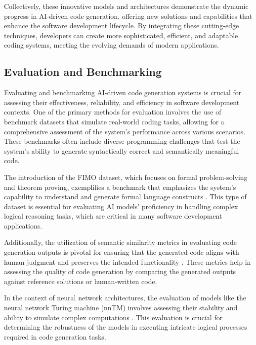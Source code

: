 Collectively, these innovative models and architectures demonstrate the dynamic progress in AI-driven code generation, offering new solutions and capabilities that enhance the software development lifecycle. By integrating these cutting-edge techniques, developers can create more sophisticated, efficient, and adaptable coding systems, meeting the evolving demands of modern applications.



\subsection{Evaluation and Benchmarking} \label{subsec:Evaluation and Benchmarking}

Evaluating and benchmarking AI-driven code generation systems is crucial for assessing their effectiveness, reliability, and efficiency in software development contexts. One of the primary methods for evaluation involves the use of benchmark datasets that simulate real-world coding tasks, allowing for a comprehensive assessment of the system's performance across various scenarios. These benchmarks often include diverse programming challenges that test the system's ability to generate syntactically correct and semantically meaningful code.



The introduction of the FIMO dataset, which focuses on formal problem-solving and theorem proving, exemplifies a benchmark that emphasizes the system's capability to understand and generate formal language constructs \cite{liu2023fimochallengeformaldataset}. This type of dataset is essential for evaluating AI models' proficiency in handling complex logical reasoning tasks, which are critical in many software development applications.



Additionally, the utilization of semantic similarity metrics in evaluating code generation outputs is pivotal for ensuring that the generated code aligns with human judgment and preserves the intended functionality \cite{yamshchikov2020styletransferparaphraselookingsensible}. These metrics help in assessing the quality of code generation by comparing the generated outputs against reference solutions or human-written code.



In the context of neural network architectures, the evaluation of models like the neural network Turing machine (nnTM) involves assessing their stability and ability to simulate complex computations \cite{stogin2022provablystableneuralnetwork}. This evaluation is crucial for determining the robustness of the models in executing intricate logical processes required in code generation tasks.



